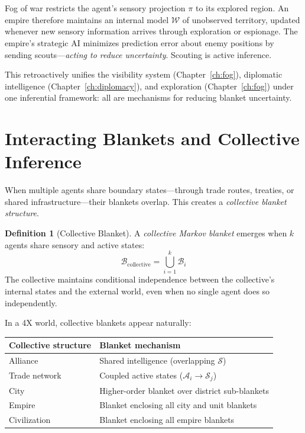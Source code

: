 \documentclass[11pt,a4paper,openany]{book}
\theoremstyle{plain}
\theoremstyle{definition}
\newtheorem{definition}[theorem]{Definition}
\theoremstyle{remark}
\newenvironment{mechanic}[1]{%
  \begin{tcolorbox}[
    title={\textbf{World Mechanic:} #1},
    colback=sphereteal!5,
    colframe=sphereteal,
    fonttitle=\bfseries\color{white},
    coltitle=white,
    sharp corners,
    breakable,
    before upper={\normalfont\setlength{\parindent}{0pt}\tolerance=9999\hbadness=9999}
  ]
}{\end{tcolorbox}}
\newcommand{\world}{\ensuremath{\mathcal{W}}}
\begin{document}
\begin{mechanic}{Fog of War as Blanket Uncertainty}
  Fog of war restricts the agent's sensory projection $\pi$ to its
  explored region. An empire therefore maintains an internal model
  $\hat{\world}$ of unobserved territory, updated whenever new sensory
  information arrives through exploration or espionage. The empire's
  strategic AI minimizes prediction error about enemy positions by
  sending scouts---\emph{acting to reduce uncertainty}. Scouting is
  active inference.
\end{mechanic}

This retroactively unifies the visibility system (Chapter~\ref{ch:fog}),
diplomatic intelligence (Chapter~\ref{ch:diplomacy}), and exploration
(Chapter~\ref{ch:fog}) under one inferential framework: all are mechanisms
for reducing blanket uncertainty.

\section{Interacting Blankets and Collective Inference}

When multiple agents share boundary states---through trade routes,
treaties, or shared infrastructure---their blankets overlap. This
creates a \emph{collective blanket structure}.

\begin{definition}[Collective Blanket]
  A \emph{collective Markov blanket} emerges when $k$ agents share
  sensory and active states:
  \[
    \mathcal{B}_{\mathrm{collective}} = \bigcup_{i=1}^k \mathcal{B}_i
  \]
  The collective maintains conditional independence between the
  collective's internal states and the external world, even when no
  single agent does so independently.
\end{definition}

In a 4X world, collective blankets appear naturally:

\begin{center}
\begin{tabular}{ll}
  \toprule
  Collective structure & Blanket mechanism \\
  \midrule
  Alliance & Shared intelligence (overlapping $\mathcal{S}$) \\
  Trade network & Coupled active states ($\mathcal{A}_i \to \mathcal{S}_j$) \\
  City & Higher-order blanket over district sub-blankets \\
  Empire & Blanket enclosing all city and unit blankets \\
  Civilization & Blanket enclosing all empire blankets \\
  \bottomrule
\end{tabular}
\end{center}
\end{document}
